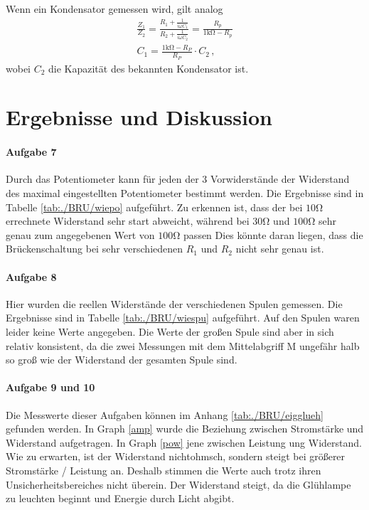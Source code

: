 \documentclass[11pt, a4paper]{article}
\begin{document}
    Wenn ein Kondensator gemessen wird, gilt analog
    \begin{align}
        \frac{Z_1}{Z_2} = \frac{R_1 + \frac{1}{i \omega C_1}}{R_2 + \frac{1}{i \omega C_2}} = \frac{R_p}{1\si{\kilo\ohm} - R_p} \\
        C_1 = \frac{1 \si{\kilo\ohm} - R_P}{R_P} \cdot C_2 \,,
    \end{align}
    wobei $C_2$ die Kapazität des bekannten Kondensator ist.
    
    \section{Ergebnisse und Diskussion}
    \paragraph{Aufgabe 7}
    Durch das Potentiometer kann für jeden der 3 Vorwiderstände der Widerstand des maximal eingestellten Potentiometer bestimmt werden. Die Ergebnisse sind in Tabelle \ref{tab:./BRU/wiepo} aufgeführt. Zu erkennen ist, dass der bei $10 \si{\ohm}$ errechnete Widerstand sehr start abweicht, während bei $30 \si{\ohm}$ und $100 \si{\ohm}$ sehr genau zum angegebenen Wert von $100 \si{\ohm}$ passen Dies könnte daran liegen, dass die Brückenschaltung bei sehr verschiedenen $R_1$ und $R_2$ nicht sehr genau ist.
    

    \paragraph{Aufgabe 8}
    Hier wurden die reellen Widerstände der verschiedenen Spulen gemessen. Die Ergebnisse sind in Tabelle \ref{tab:./BRU/wiespu} aufgeführt. Auf den Spulen waren leider keine Werte angegeben. Die Werte der großen Spule sind aber in sich relativ konsistent, da die zwei Messungen mit dem Mittelabgriff M ungefähr halb so groß wie der Widerstand der gesamten Spule sind.

    

    \paragraph{Aufgabe 9 und 10}
    Die Messwerte dieser Aufgaben können im Anhang \ref{tab:./BRU/eigglueh} gefunden werden. In Graph \ref{amp} wurde die Beziehung zwischen Stromstärke und Widerstand aufgetragen. In Graph \ref{pow} jene zwischen Leistung ung Widerstand. Wie zu erwarten, ist der Widerstand nichtohmsch, sondern steigt bei größerer Stromstärke / Leistung an. Deshalb stimmen die Werte auch trotz ihren Unsicherheitsbereiches nicht überein. Der Widerstand steigt, da die Glühlampe zu leuchten beginnt und Energie durch Licht abgibt.
\end{document}
